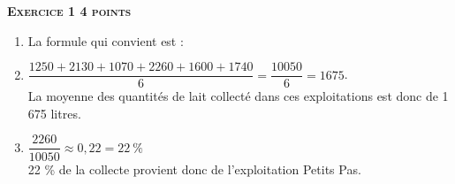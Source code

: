 \textbf{\textsc{Exercice 1 \hfill 4 points}}

\medskip

\begin{enumerate}
  \item La formule qui convient est : 
  \item $\dfrac{1250+2130+1070+2260+1600+1740}{6}=\dfrac{10050}{6}=1675$.\\
  La moyenne des quantités de lait collecté dans ces exploitations est donc de 1 675 litres.
  \item $\dfrac{2260}{10050} \approx 0,22 = 22~\%$\\
  22 \% de la collecte provient donc de l'exploitation \og Petits Pas\fg{}.
\end{enumerate}

\medskip

